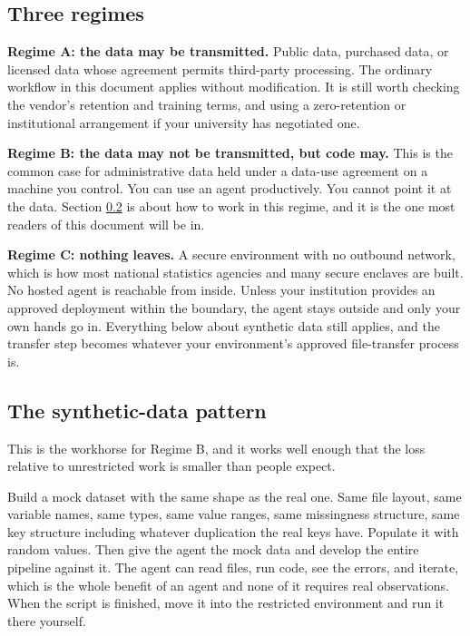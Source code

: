 \documentclass[11pt,a4paper]{article}
\begin{document}
\subsection{Three regimes}

\textbf{Regime A: the data may be transmitted.} Public data, purchased data, or
licensed data whose agreement permits third-party processing. The ordinary
workflow in this document applies without modification. It is still worth
checking the vendor's retention and training terms, and using a zero-retention or
institutional arrangement if your university has negotiated one.

\textbf{Regime B: the data may not be transmitted, but code may.} This is the
common case for administrative data held under a data-use agreement on a machine
you control. You can use an agent productively. You cannot point it at the data.
Section \ref{sec:synthetic} is about how to work in this regime, and it is the
one most readers of this document will be in.

\textbf{Regime C: nothing leaves.} A secure environment with no outbound network,
which is how most national statistics agencies and many secure enclaves are
built. No hosted agent is reachable from inside. Unless your institution provides
an approved deployment within the boundary, the agent stays outside and only your
own hands go in. Everything below about synthetic data still applies, and the
transfer step becomes whatever your environment's approved file-transfer process
is.

\subsection{The synthetic-data pattern}
\label{sec:synthetic}

This is the workhorse for Regime B, and it works well enough that the loss
relative to unrestricted work is smaller than people expect.

Build a mock dataset with the same shape as the real one. Same file layout, same
variable names, same types, same value ranges, same missingness structure, same
key structure including whatever duplication the real keys have. Populate it with
random values. Then give the agent the mock data and develop the entire pipeline
against it. The agent can read files, run code, see the errors, and iterate,
which is the whole benefit of an agent and none of it requires real observations.
When the script is finished, move it into the restricted environment and run it
there yourself.
\end{document}
